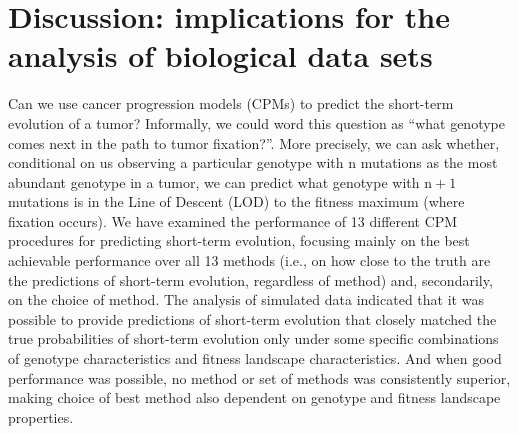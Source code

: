 \documentclass[a4paper,10pt]{article}
\newcommand{\idea}[1]{\textcolor{red}{#1}}
\newcommand{\change}[2]{\textcolor{red}{\sout{#1}}\textcolor{blue}{#2}}
\begin{document}




\section{Discussion: implications for the analysis of biological data sets} \label{discussion}

Can we use cancer progression models (CPMs) to predict the short-term
evolution of a tumor? Informally, we could word this question as ``what
genotype comes next in the path to tumor fixation?''. More precisely, we
can ask whether, conditional on us observing a particular genotype with
$\mathrm{n}$ mutations as the most abundant genotype in a tumor, we can
predict what genotype with $\mathrm{n}+1$ mutations is in the Line of
Descent (LOD) to the fitness maximum (where fixation occurs). We have
examined the performance of 13 different CPM procedures for predicting
short-term evolution, focusing mainly on the best achievable performance
over all 13 methods (i.e., on how close to the truth are the predictions
of short-term evolution, regardless of method) and, secondarily, on the
choice of method. The analysis of simulated data indicated that it was
possible to provide predictions of short-term evolution that closely
matched the true probabilities of short-term evolution only under some
specific combinations of genotype characteristics and fitness landscape
characteristics. And when  good performance was possible, no method or
set of methods was consistently superior, making choice of best method
also dependent on genotype and fitness landscape properties.


\end{document}
